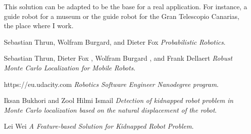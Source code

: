 \documentclass[10pt,journal,compsoc]{IEEEtran}
\begin{document}
This solution can be adapted to be the base for a real application. For instance, a guide robot for a museum or the guide robot for the Gran Telescopio Canarias, the place where I work.

\begin{thebibliography}{9}


Sebastian Thrun, Wolfram Burgard, and Dieter Fox
\textit{Probabilistic Robotics}. 

Sebastian Thrun, Dieter Fox , Wolfram Burgard , and Frank Dellaert
\textit{Robust Monte Carlo Localization for Mobile Robots}. 

https://eu.udacity.com
\textit{Robotics Software Engineer Nanodegree program}. 

Iksan Bukhori and Zool Hilmi Ismail
\textit{Detection of kidnapped robot problem in Monte Carlo localization based on the natural displacement of the robot}. 

Lei Wei
\textit{A Feature-based Solution for Kidnapped Robot Problem}. 



\end{thebibliography}
\end{document}
